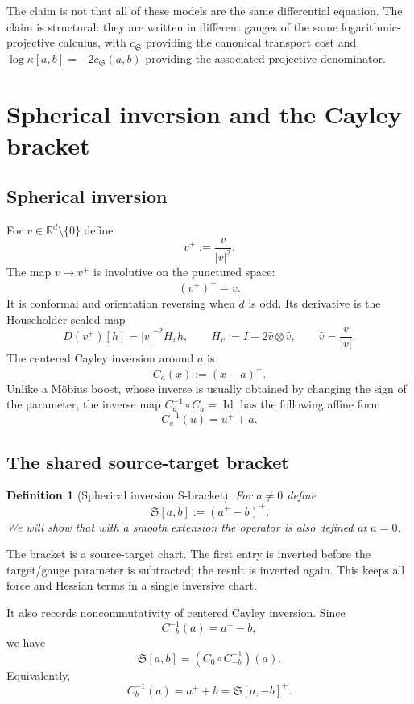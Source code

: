\documentclass[11pt]{article}
\newtheorem{definition}[theorem]{Definition}
\newcommand{\R}{\mathbb{R}}
\newcommand{\norm}[1]{\left|#1\right|}
\newcommand{\cs}{c_{\mathfrak S}}
\newcommand{\Hh}{ H}
\newcommand{\Sbr}[2]{\mathfrak S[#1,#2]}
\newcommand{\kap}[2]{\kappa[#1,#2]}
\begin{document}
The claim is not that all of these models are the same differential equation.  The claim is structural: they are written in different gauges of the same logarithmic-projective calculus, with $\cs$ providing the canonical transport cost and $\log\kap{a}{b}=-2\cs(a,b)$ providing the associated projective denominator.

\section{Spherical inversion and the Cayley bracket}

\subsection{Spherical inversion}

For $v\in\R^d\setminus\{0\}$ define
\[
    v^+:=\frac{v}{\norm v^2}.
\]
The map $v\mapsto v^+$ is involutive on the punctured space:
\[
    (v^+)^+=v.
\]
It is conformal and orientation reversing when $d$ is odd.  Its derivative is the Householder-scaled map
\[
    D(v^+)[h]=\norm v^{-2}\Hh_v h,
    \qquad
    \Hh_v:=I-2\hat v\otimes\hat v,
    \qquad
    \hat v=\frac{v}{\norm v}.
\]
The centered Cayley inversion around $a$ is
\[
    C_a(x):=(x-a)^+.
\]
Unlike a Möbius boost, whose inverse is usually obtained by changing the sign of the parameter, the inverse map $C_a^{-1}\circ C_a=\operatorname{Id}$ has the following affine form
\[
    C_a^{-1}(u)=u^+ + a.
\]

\subsection{The shared source-target bracket}

\begin{definition}[Spherical inversion S-bracket]
For $a\neq0$ define
\[
    \Sbr{a}{b}:=(a^+-b)^+.
\]
We will show that with a smooth extension the operator is also defined at $a=0$.
\end{definition}

The bracket is a source-target chart.  The first entry is inverted before the target/gauge parameter is subtracted; the result is inverted again.  This keeps all force and Hessian terms in a single inversive chart.

It also records noncommutativity of centered Cayley inversion.  Since
\[
    C_{-b}^{-1}(a)=a^+-b,
\]
we have
\[
    \Sbr{a}{b}=(C_0\circ C_{-b}^{-1})(a).
\]
Equivalently,
\[
    C_b^{-1}(a)=a^++b=\Sbr{a}{-b}^+.
\]
\end{document}
